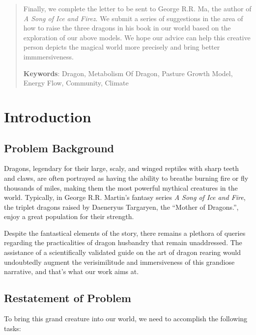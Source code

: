 \documentclass[12pt]{article}  %
\begin{document}
\begin{abstract}
Finally, we complete the letter to be sent to George R.R. Ma, the author of \textit{ A Song of Ice and Firez}. We submit a series of suggestions in the area of how to raise the three dragons in his book in our world based on the exploration of our above models. We hope our advice can help this creative person depicts the magical world more precisely and bring better immmersiveness.

 \noindent\textbf{Keywords}: Dragon, Metabolism Of Dragon, Pasture Growth Model, Energy Flow, Community, Climate

\end{abstract}

\maketitle  %
\tableofcontents  %


\section{Introduction}
\vspace{-0.5cm}
\subsection{Problem Background}

Dragons, legendary for their large, scaly, and winged reptiles with sharp teeth and claws, are often portrayed as having the ability to breathe burning fire or fly thousands of miles, making them the most powerful mythical creatures in the world. Typically, in George R.R. Martin’s fantasy series \textit{A Song of Ice and Fire}{\cite{11}}, the triplet dragons raised by Daeneryus Targaryen, the “Mother of Dragons.”, enjoy a great population for their strength.

Despite the fantastical elements of the story, there remains a plethora of queries regarding the practicalities of dragon husbandry that remain unaddressed. The assistance of a scientifically validated guide on the art of dragon rearing would undoubtedly augment the verisimilitude and immersiveness of this grandiose narrative, and that’s what our work aims at.



\vspace{-0.5cm}
\subsection{Restatement of Problem}
\vspace{-0.3cm}
To bring this grand creature into our world, we need to accomplish the following tasks:
\end{document}
